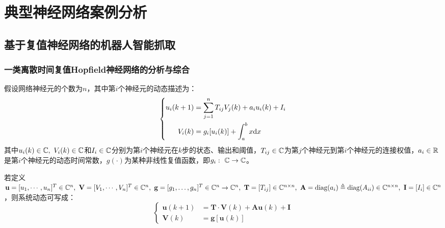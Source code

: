 
\chapter{典型神经网络案例分析}

\section{基于复值神经网络的机器人智能抓取}

\subsection{一类离散时间复值Hopf\/ield神经网络的分析与综合}

假设网络神经元的个数为$n$，其中第$i$个神经元的动态描述为：
\begin{equation}
\left\{
\begin{aligned}
	u_i(k+1)&=\sum\limits_{j=1}^nT_{ij}V_{j}(k)+a_iu_i(k)+I_i\\
	V_i(k)&=g_i[u_i(k)]+\displaystyle\int_a^b x\text{d} x
\end{aligned}
\right.
\end{equation}
其中$u_i(k)\in \mathbb{C},\ V_i(k)\in \mcc$和$I_i\in\mathbb{C}$分别为第$i$个神经元在$k$步的状态、输出和阈值，$T_{ij}\in\mathbb{C}$为第$j$个神经元到第$i$个神经元的连接权值，$a_i\in\mathbb{R}$是第$i$个神经元的动态时间常数，$g(\cdot)$为某种非线性复值函数，即$g_i:\ \mathbb{C}\rightarrow\mathbb{C}$。

若定义$\mathbf{u}=[u_1,\cdots,u_n]^T\in\mcc^n,\ \mathbf{ V}=[V_1,\cdots,V_n]^T\in\mcc^n,\ \mathbf{g}=[g_1,\ldots,g_n]^T\in\mcc^n\rightarrow\mcc^n,\ \mathbf{ T}
=[T_{ij}]\in\mcc^{n\times n},\ \mathbf{A}=\diag(a_i)\triangleq \diag(A_{ii})
\in\mcc^{n\times n},\ \mathbf{ I}=[I_{i}]\in\mcc^{n}$，则系统动态可写成：
\begin{equation}
\left\{
\begin{aligned}
	\mathbf{u}(k+1)&=\mathbf{T}\cdot\mathbf{V}(k)+\mathbf{A}\mathbf{u}(k)+\mathbf{ I}\\
	\mathbf{V}(k)&=\mathbf{g}[\mathbf{u}(k)]
\end{aligned}
\right.
\end{equation}

